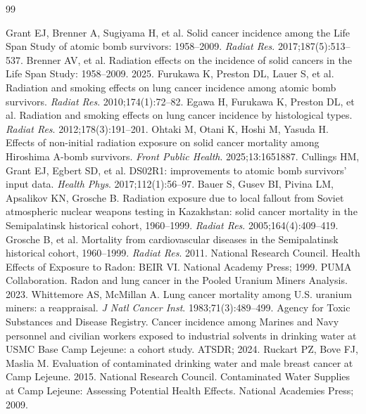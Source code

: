 \documentclass[3p,times]{elsarticle}
\begin{document}
\begin{thebibliography}{99}
\footnotesize

 Grant EJ, Brenner A, Sugiyama H, et al. Solid cancer incidence among the Life Span Study of atomic bomb survivors: 1958--2009. \textit{Radiat Res}. 2017;187(5):513--537.
 Brenner AV, et al. Radiation effects on the incidence of solid cancers in the Life Span Study: 1958--2009. 2025.
 Furukawa K, Preston DL, Lauer S, et al. Radiation and smoking effects on lung cancer incidence among atomic bomb survivors. \textit{Radiat Res}. 2010;174(1):72--82.
 Egawa H, Furukawa K, Preston DL, et al. Radiation and smoking effects on lung cancer incidence by histological types. \textit{Radiat Res}. 2012;178(3):191--201.
 Ohtaki M, Otani K, Hoshi M, Yasuda H. Effects of non-initial radiation exposure on solid cancer mortality among Hiroshima A-bomb survivors. \textit{Front Public Health}. 2025;13:1651887.
 Cullings HM, Grant EJ, Egbert SD, et al. DS02R1: improvements to atomic bomb survivors' input data. \textit{Health Phys}. 2017;112(1):56--97.
 Bauer S, Gusev BI, Pivina LM, Apsalikov KN, Grosche B. Radiation exposure due to local fallout from Soviet atmospheric nuclear weapons testing in Kazakhstan: solid cancer mortality in the Semipalatinsk historical cohort, 1960--1999. \textit{Radiat Res}. 2005;164(4):409--419.
 Grosche B, et al. Mortality from cardiovascular diseases in the Semipalatinsk historical cohort, 1960--1999. \textit{Radiat Res}. 2011.
 National Research Council. Health Effects of Exposure to Radon: BEIR VI. National Academy Press; 1999.
 PUMA Collaboration. Radon and lung cancer in the Pooled Uranium Miners Analysis. 2023.
 Whittemore AS, McMillan A. Lung cancer mortality among U.S. uranium miners: a reappraisal. \textit{J Natl Cancer Inst}. 1983;71(3):489--499.
 Agency for Toxic Substances and Disease Registry. Cancer incidence among Marines and Navy personnel and civilian workers exposed to industrial solvents in drinking water at USMC Base Camp Lejeune: a cohort study. ATSDR; 2024.
 Ruckart PZ, Bove FJ, Maslia M. Evaluation of contaminated drinking water and male breast cancer at Camp Lejeune. 2015.
 National Research Council. Contaminated Water Supplies at Camp Lejeune: Assessing Potential Health Effects. National Academies Press; 2009.

\end{thebibliography}
\end{document}
